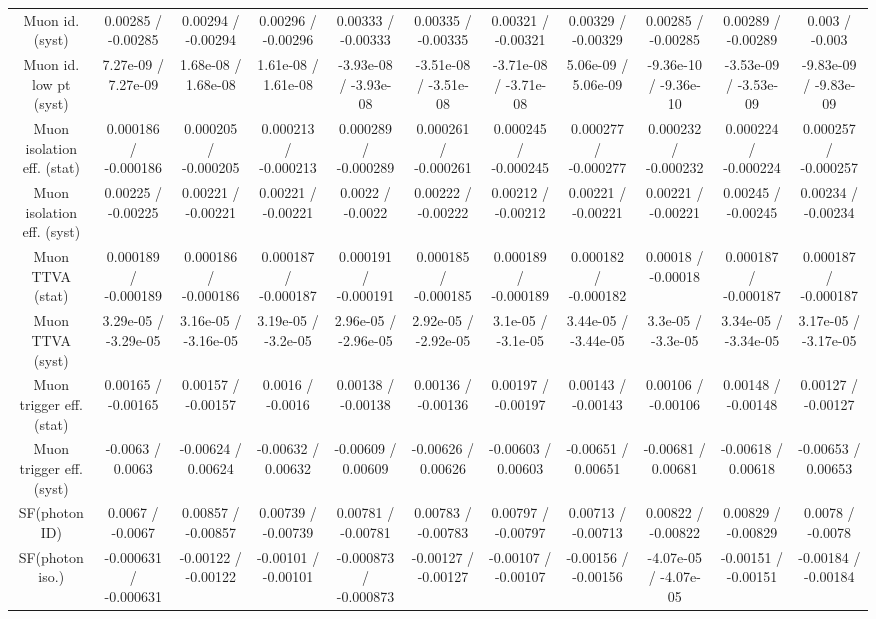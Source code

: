 \begin{table}[htbp]
\begin{center}
\begin{tabular}{|c|c|c|c|c|c|c|c|c|c|c|}
  Muon id. (syst) & 0.00285 / -0.00285 & 0.00294 / -0.00294 & 0.00296 / -0.00296 & 0.00333 / -0.00333 & 0.00335 / -0.00335 & 0.00321 / -0.00321 & 0.00329 / -0.00329 & 0.00285 / -0.00285 & 0.00289 / -0.00289 & 0.003 / -0.003 \\ 
  Muon id. low pt (syst) & 7.27e-09 / 7.27e-09 & 1.68e-08 / 1.68e-08 & 1.61e-08 / 1.61e-08 & -3.93e-08 / -3.93e-08 & -3.51e-08 / -3.51e-08 & -3.71e-08 / -3.71e-08 & 5.06e-09 / 5.06e-09 & -9.36e-10 / -9.36e-10 & -3.53e-09 / -3.53e-09 & -9.83e-09 / -9.83e-09 \\ 
  Muon isolation eff. (stat) & 0.000186 / -0.000186 & 0.000205 / -0.000205 & 0.000213 / -0.000213 & 0.000289 / -0.000289 & 0.000261 / -0.000261 & 0.000245 / -0.000245 & 0.000277 / -0.000277 & 0.000232 / -0.000232 & 0.000224 / -0.000224 & 0.000257 / -0.000257 \\ 
  Muon isolation eff. (syst) & 0.00225 / -0.00225 & 0.00221 / -0.00221 & 0.00221 / -0.00221 & 0.0022 / -0.0022 & 0.00222 / -0.00222 & 0.00212 / -0.00212 & 0.00221 / -0.00221 & 0.00221 / -0.00221 & 0.00245 / -0.00245 & 0.00234 / -0.00234 \\ 
  Muon TTVA (stat) & 0.000189 / -0.000189 & 0.000186 / -0.000186 & 0.000187 / -0.000187 & 0.000191 / -0.000191 & 0.000185 / -0.000185 & 0.000189 / -0.000189 & 0.000182 / -0.000182 & 0.00018 / -0.00018 & 0.000187 / -0.000187 & 0.000187 / -0.000187 \\ 
  Muon TTVA (syst) & 3.29e-05 / -3.29e-05 & 3.16e-05 / -3.16e-05 & 3.19e-05 / -3.2e-05 & 2.96e-05 / -2.96e-05 & 2.92e-05 / -2.92e-05 & 3.1e-05 / -3.1e-05 & 3.44e-05 / -3.44e-05 & 3.3e-05 / -3.3e-05 & 3.34e-05 / -3.34e-05 & 3.17e-05 / -3.17e-05 \\ 
  Muon trigger eff. (stat) & 0.00165 / -0.00165 & 0.00157 / -0.00157 & 0.0016 / -0.0016 & 0.00138 / -0.00138 & 0.00136 / -0.00136 & 0.00197 / -0.00197 & 0.00143 / -0.00143 & 0.00106 / -0.00106 & 0.00148 / -0.00148 & 0.00127 / -0.00127 \\ 
  Muon trigger eff. (syst) & -0.0063 / 0.0063 & -0.00624 / 0.00624 & -0.00632 / 0.00632 & -0.00609 / 0.00609 & -0.00626 / 0.00626 & -0.00603 / 0.00603 & -0.00651 / 0.00651 & -0.00681 / 0.00681 & -0.00618 / 0.00618 & -0.00653 / 0.00653 \\ 
  SF(photon ID) & 0.0067 / -0.0067 & 0.00857 / -0.00857 & 0.00739 / -0.00739 & 0.00781 / -0.00781 & 0.00783 / -0.00783 & 0.00797 / -0.00797 & 0.00713 / -0.00713 & 0.00822 / -0.00822 & 0.00829 / -0.00829 & 0.0078 / -0.0078 \\ 
  SF(photon iso.) & -0.000631 / -0.000631 & -0.00122 / -0.00122 & -0.00101 / -0.00101 & -0.000873 / -0.000873 & -0.00127 / -0.00127 & -0.00107 / -0.00107 & -0.00156 / -0.00156 & -4.07e-05 / -4.07e-05 & -0.00151 / -0.00151 & -0.00184 / -0.00184 \\ 

\end{tabular}
\end{center}
\end{table}
